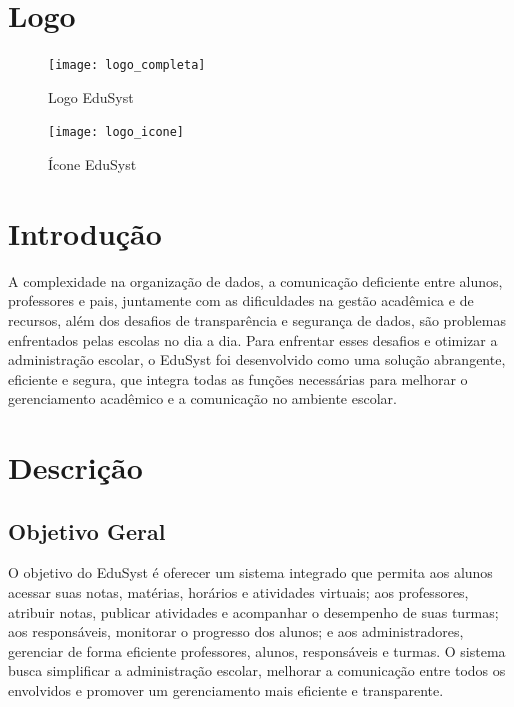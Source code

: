 \documentclass[main.tex]{subfiles}
\begin{document}
\section{Logo}

\begin{figure}[h!]
    \centering
    \texttt{[image: logo\_completa]}
    \caption{Logo EduSyst}
\end{figure}

\begin{figure}[h!]
    \centering
    \texttt{[image: logo\_icone]}
    \caption{Ícone EduSyst}
\end{figure}

\section{Introdução}
A complexidade na organização de dados, a comunicação deficiente entre alunos, professores e pais, juntamente com as dificuldades na gestão acadêmica e de recursos, além dos desafios de transparência e segurança de dados, são problemas enfrentados pelas escolas no dia a dia. Para enfrentar esses desafios e otimizar a administração escolar, o EduSyst foi desenvolvido como uma solução abrangente, eficiente e segura, que integra todas as funções necessárias para melhorar o gerenciamento acadêmico e a comunicação no ambiente escolar.

\section{Descrição}

\subsection{Objetivo Geral}
O objetivo do EduSyst é oferecer um sistema integrado que permita aos alunos acessar suas notas, matérias, horários e atividades virtuais; aos professores, atribuir notas, publicar atividades e acompanhar o desempenho de suas turmas; aos responsáveis, monitorar o progresso dos alunos; e aos administradores, gerenciar de forma eficiente professores, alunos, responsáveis e turmas. O sistema busca simplificar a administração escolar, melhorar a comunicação entre todos os envolvidos e promover um gerenciamento mais eficiente e transparente.
\end{document}
